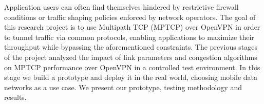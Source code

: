 Application users can often find themselves hindered by restrictive firewall conditions or traffic shaping policies enforced by network operators. The goal of this research project is to use Multipath TCP (MPTCP) over OpenVPN in order to tunnel traffic via common protocols, enabling applications to maximize their throughput while bypassing the aforementioned constraints. The previous stages of the project analyzed the impact of link parameters and congestion algorithms on MPTCP performance over OpenVPN in a controlled test environment. In this stage we build a prototype and deploy it in the real world, choosing mobile data networks as a use case. We present our prototype, testing methodology and results.